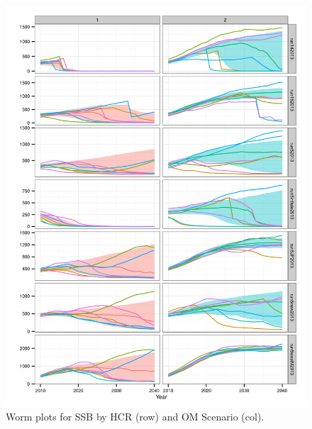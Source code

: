 \documentclass[a4paper, 10pt]{article}
\begin{document}
\begin{figure}[htbp]
\centering
\includegraphics[width=6in]{iS.png}
\caption{Worm plots for SSB by HCR (row) and OM Scenario (col).}
\label{fig:2}
\end{figure}

\printglossary
\end{document}
